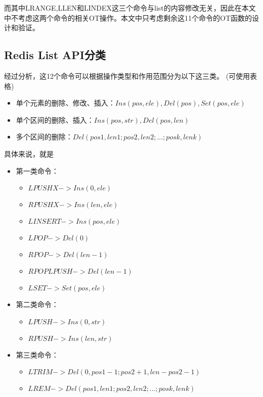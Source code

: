 \par 而其中LRANGE,LLEN和LINDEX这三个命令与list的内容修改无关，因此在本文中不考虑这两个命令的相关OT操作。本文中只考虑剩余这11个命令的OT函数的设计和验证。
\subsection{Redis List API分类}
\par 经过分析，这12个命令可以根据操作类型和作用范围分为以下这三类。
(可使用表格)
\begin{itemize}
\item 单个元素的删除、修改、插入：$ Ins(pos,ele),Del(pos),Set(pos,ele)$\\
\item 单个区间的删除、插入：$Ins(pos,str),Del(pos,len)$\\
\item 多个区间的删除：$ Del(pos1,len1;pos2,len2;...;posk,lenk) $\\
\end{itemize}
\par 具体来说，就是
\begin{itemize}
\item 第一类命令：
	\begin{itemize}
	\item $LPUSHX -> Ins(0,ele)$
	\item $RPUSHX -> Ins(len,ele)$
	\item $LINSERT -> Ins(pos,ele)$
	\item $LPOP -> Del(0)$
	\item $RPOP -> Del(len-1)$
	\item $RPOPLPUSH  -> Del(len-1)$
	\item $LSET -> Set(pos,ele)$
	\end{itemize}
\item 第二类命令：
	\begin{itemize}
	\item $LPUSH -> Ins(0,str)$
	\item $RPUSH -> Ins(len,str)$
	\end{itemize}
\item 第三类命令： 
	\begin{itemize}
	\item $LTRIM -> Del(0,pos1-1;pos2+1,len-pos2-1)$
	\item $LREM ->  Del(pos1,len1;pos2,len2;...;posk,lenk)$
	\end{itemize}
\end{itemize}

